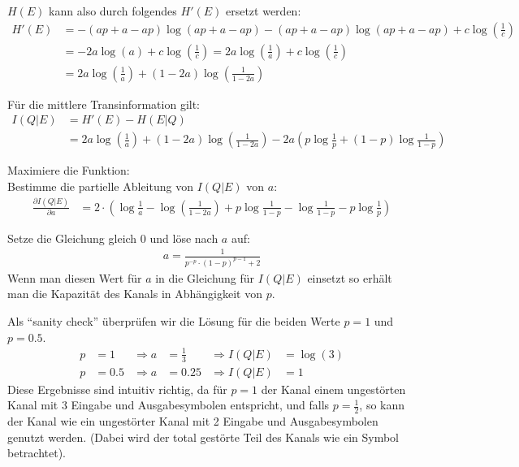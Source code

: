 \begin{myList}
$H(E)$ kann also durch folgendes $H'(E)$ ersetzt werden:
\begin{align*}
	H'(E) &= -(ap + a - ap)\log(ap + a - ap) -(ap + a - ap)\log(ap + a - ap) + c \log \left(\frac{1}{c} \right)\\
	&= -2a\log(a) + c \log \left(\frac{1}{c} \right) = 2 a\log \left( \frac{1}{a}\right) + c \log \left(\frac{1}{c} \right) \\
	&= 2 a\log \left( \frac{1}{a}\right) + (1-2a) \log \left(\frac{1}{1 - 2a} \right)
\end{align*}

Für die mittlere Transinformation gilt:
\begin{align*}
	I(Q|E) &= H'(E) - H(E|Q) \\
	&= 2 a\log \left( \frac{1}{a}\right) + (1-2a) \log \left(\frac{1}{1 - 2a} \right) - 2a\left(p\log \frac{1}{p} + (1-p) \log \frac{1}{1-p} \right)
\end{align*}

Maximiere die Funktion:\\
Bestimme die partielle Ableitung von $I(Q|E)$ von $a$:
\begin{align*}
	\frac{\partial I(Q|E)}{\partial a} &= 2 \cdot \left( \log \frac{1}{a} - \log(\frac{1}{1-2a}) + p\log \frac{1}{1-p} - \log \frac{1}{1-p} - p \log \frac{1}{p} \right)
\end{align*}

Setze die Gleichung gleich $0$ und löse nach $a$ auf:
\begin{align*}
	a = \frac{1}{p^{-p} \cdot (1-p)^{p-1} + 2}
\end{align*}
Wenn man diesen Wert für $a$ in die Gleichung für $I(Q|E)$ einsetzt so erhält man die Kapazität des Kanals in Abhängigkeit von $p$.

Als \enquote{sanity check} überprüfen wir die Lösung für die beiden Werte $p = 1$ und $p = 0.5$.
\begin{align*}
	p &= 1  &\Rightarrow a &= \frac{1}{3} &\Rightarrow I(Q|E) &= \log(3) \\
	p &= 0.5 &\Rightarrow a &= 0.25 &\Rightarrow I(Q|E) &= 1
\end{align*}
Diese Ergebnisse sind intuitiv richtig, da für $p = 1$ der Kanal einem ungestörten Kanal mit 3 Eingabe und Ausgabesymbolen entspricht, und falls $p = \frac{1}{2}$, so kann der Kanal wie ein ungestörter Kanal mit 2 Eingabe und Ausgabesymbolen genutzt werden.
(Dabei wird der total gestörte Teil des Kanals wie ein Symbol betrachtet).
\end{myList}

